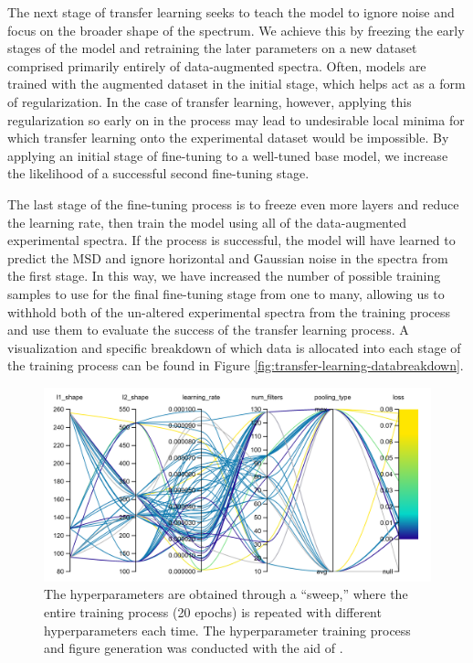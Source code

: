 The next stage of transfer learning seeks to teach the model to ignore noise and focus on the broader shape of the spectrum. We achieve this by freezing the early stages of the model and retraining the later parameters on a new dataset comprised primarily entirely of data-augmented spectra. Often, models are trained with the augmented dataset in the initial stage, which helps act as a form of regularization. In the case of transfer learning, however, applying this regularization so early on in the process may lead to undesirable local minima for which transfer learning onto the experimental dataset would be impossible. By applying an initial stage of fine-tuning to a well-tuned base model, we increase the likelihood of a successful second fine-tuning stage.

The last stage of the fine-tuning process is to freeze even more layers and reduce the learning rate, then train the model using all of the data-augmented experimental spectra. If the process is successful, the model will have learned to predict the MSD and ignore horizontal and Gaussian noise in the spectra from the first stage. In this way, we have increased the number of possible training samples to use for the final fine-tuning stage from one to many, allowing us to withhold both of the un-altered experimental spectra from the training process and use them to evaluate the success of the transfer learning process. A visualization and specific breakdown of which data is allocated into each stage of the training process can be found in Figure \ref{fig:transfer-learning-databreakdown}.

\begin{figure}
    \centering
    \includegraphics[width=\linewidth]{Chapters/Figures/new-hyperparameter-sweep-meta-1.png}
    \caption[Hyperpamater Sweep: Graphical Representation]{The hyperparameters are obtained through a ``sweep,'' where the entire training process (20 epochs) is repeated with different hyperparameters each time. The hyperparameter training process and figure generation was conducted with the aid of \cite{wandb}.}
    \label{fig:meta-1-sweep-params}
\end{figure}


